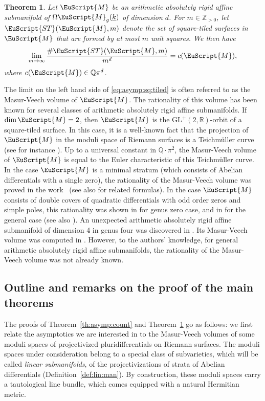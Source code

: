 \documentclass[10pt]{amsart}
\let\mathcal\EuScript
\theoremstyle{plain}
\newtheorem{Theorem}{Theorem}[section]
\theoremstyle{definition}
\newcommand{\R}{\mathbb{R}}
\newcommand\Z{\mathbb{Z}}
\newcommand{\Q}{\mathbb{Q}}
\newcommand{\Mcal}{\mathcal{M}}
\newcommand{\cM}{\mathcal{M}}
\newcommand{\ST}{\mathcal{ST}}
\newcommand{\GL}{\mathrm{GL}}
\let\ul\underline
\newcommand{\trate}{\Omega\Mcal_{g}(\ul{k})}
\begin{document}
\begin{Theorem}\label{th:aff:subman:count}
Let $\Mcal$ be an \emph{arithmetic absolutely rigid} affine submanifold of $\trate$ of dimension $d$. For $m\in \Z_{>0}$, let $\ST(\Mcal,m)$ denote the set of square-tiled surfaces in $\Mcal$ that are formed by at most $m$ unit squares. We then have
\begin{equation}\label{eq:asymp:sq:tiled}
\lim_{m \to \infty}\frac{\#\ST(\Mcal,m)}{m^{d}}=c(\Mcal),
\end{equation}
where $c(\Mcal) \in \Q\pi^{d}$.
\end{Theorem}
The limit on the left hand side of \eqref{eq:asymp:sq:tiled} is often referred to as the Masur-Veech volume of $\cM$.
The rationality of this volume has been known for several classes of arithmetic absolutely rigid affine submanifolds.
If $\dim \cM=2$, then $\cM$ is the $\GL^+(2,\R)$\nobreakdash-orbit of a square-tiled surface. In this case, it is a well-known fact that the projection of $\cM$ in the moduli space of Riemann surfaces is a Teichmüller curve (see for instance \cite{SW04}). Up to a universal constant in $\Q\cdot\pi^2$, the Masur-Veech volume of $\cM$ is equal to the Euler characteristic of this Teichmüller curve.
In the case $\cM$ is a minimal stratum (which consists of Abelian differentials with a single zero), the rationality of the Masur-Veech volume was proved in the work~\cite{EO01} (see also \cite{Sau18} for related formulas). In the case $\cM$ consists of double covers of quadratic differentials with odd order zeros and simple poles, this rationality was shown in \cite{AEZ16} for genus zero case, and in \cite{CMS19} for the general case (see also \cite{EO06,Goujard}).
An unexpected arithmetic absolutely rigid affine submanifold of dimension 4 in genus four was discovered in \cite{MMW17}.
Its Masur-Veech volume was computed in \cite{TT19}.
However, to the authors' knowledge, for general arithmetic absolutely rigid affine submanifolds, the rationality of the Masur-Veech volume was not already known.

\subsection{Outline and remarks on the proof of the main theorems}\label{subsec:outline}
The proofs of Theorem~\ref{th:asymp:count} and Theorem~\ref{th:aff:subman:count} go as follows: we first relate the asymptotics we are interested in to the Masur-Veech volumes of some moduli spaces of projectivized pluri\-differentials on Riemann surfaces. The moduli spaces under consideration belong to a special class of subvarieties, which will be called \emph{linear submanifolds}, of the projectivizations of strata of Abelian differentials (\cf Definition~\ref{def:lin:man}). By construction, these moduli spaces carry a tautological line bundle, which comes equipped with a natural Hermitian metric.
\end{document}
